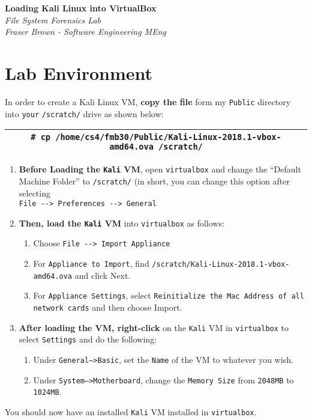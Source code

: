 \documentclass[a4paper,11pt]{article}
\author{Fraser Brown}
\date{\today}
\begin{document}
   \begin{center}
      \Large\textbf{Loading Kali Linux into VirtualBox}\\
      \large\textit{File System Forensics Lab}\\
      \large\textit{Fraser Brown - Software Engineering MEng}
   \end{center}
\section{Lab Environment}
In order to create a Kali Linux VM, \textbf{copy the file} form my \texttt{Public} directory into \texttt{your} \texttt{/scratch/} drive as shown below:\\
\begin{tabular}{|c|}
	\hline
		\texttt{{\#} cp /home/cs4/fmb30/Public/Kali-Linux-2018.1-vbox-amd64.ova /scratch/} \\
	\hline
\end{tabular}

\begin{enumerate}
	\item \textbf{Before Loading the \texttt{Kali} VM}, open \texttt{virtualbox} and change the ``Default Machine Folder'' to \texttt{/scratch/} (in short, you can change this option after selecting\\ \verb|File --> Preferences --> General|
	\item \textbf{Then, load the \texttt{Kali} VM} into \texttt{virtualbox} as follows:
	\begin{enumerate}
		\item Choose \verb|File --> Import Appliance|
		\item For \texttt{Appliance to Import}, find \texttt{/scratch/Kali-Linux-2018.1-vbox-amd64.ova} and click Next.
		\item For \texttt{Appliance Settings}, select \texttt{Reinitialize the Mac Address of all network cards} and then choose Import.
	\end{enumerate}
	\item \textbf{After loading the VM, right-click} on the \texttt{Kali} VM in \texttt{virtualbox} to select \texttt{Settings} and do the following: 
	\begin{enumerate}
		\item Under \texttt{General-->Basic}, set the \texttt{Name} of the VM to whatever you wish.
		\item Under \texttt{System-->Motherboard}, change the \texttt{Memory Size} from \texttt{2048MB} to \texttt{1024MB}.
	\end{enumerate}
\end{enumerate}

You should now have an installed \texttt{Kali} VM installed in \texttt{virtualbox}.
\end{document}
